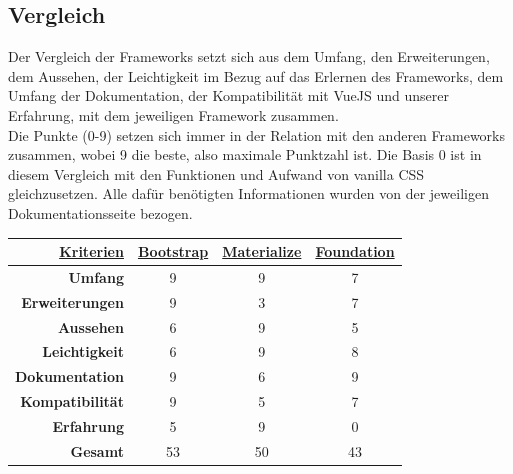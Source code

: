 	\subsection{Vergleich}
	Der Vergleich der Frameworks setzt sich aus dem Umfang, den Erweiterungen, dem Aussehen, der Leichtigkeit im Bezug auf das Erlernen des Frameworks, dem Umfang der Dokumentation, der Kompatibilität mit VueJS und unserer Erfahrung, mit dem jeweiligen Framework zusammen.\\
	Die Punkte (0-9) setzen sich immer in der Relation mit den anderen Frameworks zusammen, wobei 9 die beste, also maximale Punktzahl ist. Die Basis 0 ist in diesem Vergleich mit den Funktionen und Aufwand von vanilla CSS gleichzusetzen. Alle dafür benötigten Informationen wurden von der jeweiligen Dokumentationsseite bezogen.
	\begin{center}
		\begin{table}
			\centering
		\begin{tabular}{rccc}
			\hline
			\multicolumn{1}{|r|}{{\underline{\textbf{Kriterien}}}} & \multicolumn{1}{c|}{{\underline{\textbf{Bootstrap}}}} & \multicolumn{1}{c|}{{ \underline{\textbf{Materialize}}}} & \multicolumn{1}{c|}{{\underline{\textbf{Foundation}}}} \\ \hline
			\multicolumn{1}{|r|}{\textbf{Umfang}}          & \multicolumn{1}{c|}{9}                        & \multicolumn{1}{c|}{9}                          & \multicolumn{1}{c|}{7}                         \\ \hline
			\multicolumn{1}{|r|}{\textbf{Erweiterungen}}   & \multicolumn{1}{c|}{9}                        & \multicolumn{1}{c|}{3}                          & \multicolumn{1}{c|}{7}                         \\ \hline
			\multicolumn{1}{|r|}{\textbf{Aussehen}}        & \multicolumn{1}{c|}{6}                        & \multicolumn{1}{c|}{9}                          & \multicolumn{1}{c|}{5}                         \\ \hline
			\multicolumn{1}{|r|}{\textbf{Leichtigkeit}}    & \multicolumn{1}{c|}{6}                        & \multicolumn{1}{c|}{9}                          & \multicolumn{1}{c|}{8}                         \\ \hline
			\multicolumn{1}{|r|}{\textbf{Dokumentation}}   & \multicolumn{1}{c|}{9}                        & \multicolumn{1}{c|}{6}                          & \multicolumn{1}{c|}{9}                         \\ \hline
			\multicolumn{1}{|r|}{\textbf{Kompatibilität}}  & \multicolumn{1}{c|}{9}                        & \multicolumn{1}{c|}{5}                          & \multicolumn{1}{c|}{7}                         \\ \hline
			\multicolumn{1}{|r|}{\textbf{Erfahrung}}       & \multicolumn{1}{c|}{5}                        & \multicolumn{1}{c|}{9}                          & \multicolumn{1}{c|}{0}                         \\ \hline
			\textbf{Gesamt}                                & 53                                            & 50                                              & 43                                            
		\end{tabular}
	\end{table}
	\end{center}
